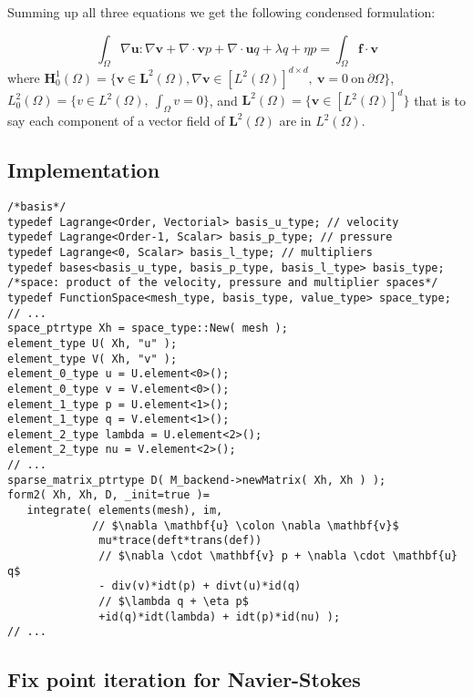 Summing up all three equations we get the following condensed formulation:

\begin{equation}
  \label{notes:eq:19}
  \int_\Omega \nabla \mathbf{u} \colon \nabla \mathbf{v} + \nabla \cdot \mathbf{v} p + \nabla \cdot \mathbf{u} q + \lambda q + \eta p = \int_\Omega \mathbf{f} \cdot \mathbf{v}
\end{equation}
where $\mathbf{H}^1_0(\Omega)= \Big\{ \mathbf{v} \in \mathbf{L}^2(\Omega), \nabla \mathbf{v} \in [L^2(\Omega)]^{d\times d},\ \mathbf{v} = 0\ \text{on}\ \partial \Omega \Big\}$,
$L^2_0(\Omega)= \Big\{ v \in L^2(\Omega),\ \int_\Omega v = 0\Big\}$, and
$\mathbf{L}^2(\Omega)= \Big\{ \mathbf{v} \in [L^2(\Omega)]^d\Big\}$ that is to say each component of a  vector field of $\mathbf{L}^2(\Omega)$ are in $L^2(\Omega)$.


\subsection{Implementation}
\label{sec:implementation}

  \begin{lstlisting}
/*basis*/
typedef Lagrange<Order, Vectorial> basis_u_type; // velocity
typedef Lagrange<Order-1, Scalar> basis_p_type; // pressure
typedef Lagrange<0, Scalar> basis_l_type; // multipliers
typedef bases<basis_u_type, basis_p_type, basis_l_type> basis_type;
/*space: product of the velocity, pressure and multiplier spaces*/
typedef FunctionSpace<mesh_type, basis_type, value_type> space_type;
// ...
space_ptrtype Xh = space_type::New( mesh );
element_type U( Xh, "u" );
element_type V( Xh, "v" );
element_0_type u = U.element<0>();
element_0_type v = V.element<0>();
element_1_type p = U.element<1>();
element_1_type q = V.element<1>();
element_2_type lambda = U.element<2>();
element_2_type nu = V.element<2>();
// ...
sparse_matrix_ptrtype D( M_backend->newMatrix( Xh, Xh ) );
form2( Xh, Xh, D, _init=true )=
   integrate( elements(mesh), im,
             // $\nabla \mathbf{u} \colon \nabla \mathbf{v}$
              mu*trace(deft*trans(def))
              // $\nabla \cdot \mathbf{v} p + \nabla \cdot \mathbf{u} q$
              - div(v)*idt(p) + divt(u)*id(q)
              // $\lambda q + \eta p$
              +id(q)*idt(lambda) + idt(p)*id(nu) );
// ...
  \end{lstlisting}


\subsection{Fix point iteration for Navier-Stokes}
\label{sec:fix-point-iteration}

